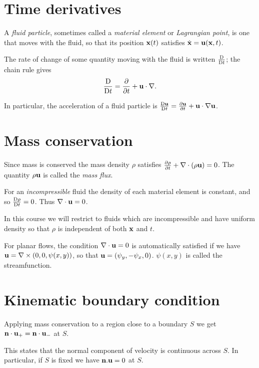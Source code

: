 \documentclass{notes}
\theoremstyle{plain}
\begin{document}
\section{Time derivatives}

A \emph{fluid particle}, sometimes called a \emph{material element} or
\emph{Lagrangian point}, is one that moves with the fluid,
so that its position $\mathbf{x}(t)$ satisfies $\dot{\mathbf{x}} = \mathbf{u}(\mathbf{x},t)$.

The rate of change of some quantity moving with the fluid is written
$\frac{\mathrm{D}}{\mathrm{D} t}$; the chain rule gives
\begin{equation}\label{eq:matder}
\frac{\mathrm{D}}{\mathrm{D} t} = \frac{\partial }{\partial t} + \mathbf{u}\cdot\nabla.
\end{equation}

In particular, the acceleration of a fluid particle is
$\frac{\mathrm{D}\mathbf{u}}{\mathrm{D} t} = \frac{\partial \mathbf{u}}{\partial t} + \mathbf{u} \cdot \nabla \mathbf{u}$.

\section{Mass conservation}

Since mass is conserved the mass density $\rho$ satisfies
$\frac{\partial \rho}{\partial t} + \nabla \cdot (\rho \mathbf{u}) = 0$.  The quantity
$\rho \mathbf{u}$ is called the \emph{mass flux}.

For an \emph{incompressible} fluid the density of each material element
is constant, and so $\frac{\mathrm{D}\rho}{\mathrm{D} t} = 0$.  Thus $\nabla \cdot \mathbf{u} = 0$.

In this course we will restrict to fluids which are incompressible and
have uniform density so that $\rho$ is independent of both $\mathbf{x}$ and
$t$.

For planar flows, the condition $\nabla \cdot \mathbf{u} = 0$ is
automatically satisfied if we have $\mathbf{u} = \nabla \times (0,0,\psi(x,y))$,
so that $\mathbf{u} = (\psi_y,-\psi_x,0)$.  $\psi(x,y)$ is called the streamfunction.

\section{Kinematic boundary condition}

Applying mass conservation to a region close to a boundary $S$
we get $\mathbf{n}\cdot\mathbf{u}_+ = \mathbf{n} \cdot \mathbf{u}_-$ at $S$.

\vspace{1in}

This states that the normal component of velocity is continuous across $S$.
In particular, if $S$ is fixed we have $\mathbf{n}.\mathbf{u} = 0$ at $S$.
\end{document}
